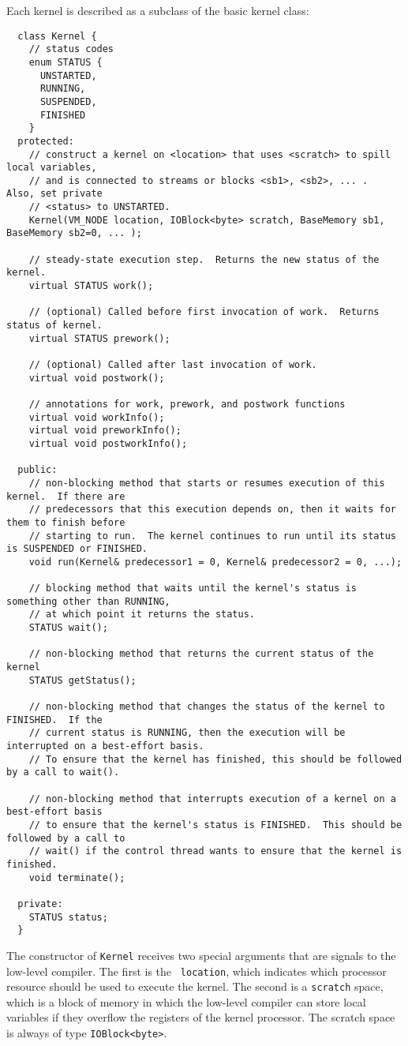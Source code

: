 Each kernel is described as a subclass of the basic kernel class:
{\small
\begin{verbatim}
  class Kernel {
    // status codes
    enum STATUS {
      UNSTARTED,
      RUNNING,
      SUSPENDED,
      FINISHED
    }
  protected:
    // construct a kernel on <location> that uses <scratch> to spill local variables,
    // and is connected to streams or blocks <sb1>, <sb2>, ... .  Also, set private 
    // <status> to UNSTARTED.
    Kernel(VM_NODE location, IOBlock<byte> scratch, BaseMemory sb1, BaseMemory sb2=0, ... );

    // steady-state execution step.  Returns the new status of the kernel.
    virtual STATUS work();

    // (optional) Called before first invocation of work.  Returns status of kernel.
    virtual STATUS prework();

    // (optional) Called after last invocation of work.
    virtual void postwork();

    // annotations for work, prework, and postwork functions
    virtual void workInfo();
    virtual void preworkInfo();
    virtual void postworkInfo();
   
  public:
    // non-blocking method that starts or resumes execution of this kernel.  If there are 
    // predecessors that this execution depends on, then it waits for them to finish before 
    // starting to run.  The kernel continues to run until its status is SUSPENDED or FINISHED.
    void run(Kernel& predecessor1 = 0, Kernel& predecessor2 = 0, ...);

    // blocking method that waits until the kernel's status is something other than RUNNING,
    // at which point it returns the status.
    STATUS wait();

    // non-blocking method that returns the current status of the kernel
    STATUS getStatus();

    // non-blocking method that changes the status of the kernel to FINISHED.  If the
    // current status is RUNNING, then the execution will be interrupted on a best-effort basis.
    // To ensure that the kernel has finished, this should be followed by a call to wait().

    // non-blocking method that interrupts execution of a kernel on a best-effort basis 
    // to ensure that the kernel's status is FINISHED.  This should be followed by a call to 
    // wait() if the control thread wants to ensure that the kernel is finished.
    void terminate();

  private:
    STATUS status;
  }  
\end{verbatim}}
The constructor of {\tt Kernel} receives two special arguments that
are signals to the low-level compiler.  The first is the {\tt
location}, which indicates which processor resource should be used to
execute the kernel.  The second is a {\tt scratch} space, which is a
block of memory in which the low-level compiler can store local
variables if they overflow the registers of the kernel processor.  The
scratch space is always of type {\tt IOBlock<byte>}.  

